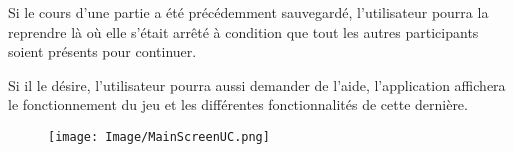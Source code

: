 \documentclass[french, utf8]{article}
\begin{document}
Si le cours d'une partie a été précédemment sauvegardé, l'utilisateur pourra la reprendre là où elle s'était arrêté à condition que tout les autres participants soient présents pour continuer.

Si il le désire, l'utilisateur pourra aussi demander de l'aide, l'application affichera le fonctionnement du jeu et les différentes fonctionnalités de cette dernière.


\begin{figure}[ht]
     \centering
    \texttt{[image: Image/MainScreenUC.png]}

\end{figure}
\end{document}
